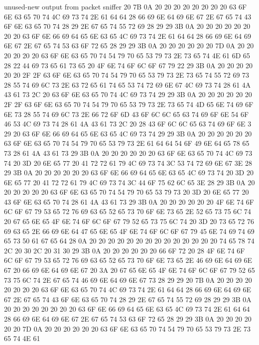 \begin{chunk}{unused-new output from packet sniffer}
20 7B 0A 20 20 20 20 20 20 20 20 63 6F 6E 63 65 70 74 4C 69 73 74 2E 61 64 
64 28 66 69 6E 64 69 6E 67 2E 67 65 74 43 6F 6E 63 65 70 74 28 29 2E 67 65 
74 55 72 69 28 29 29 3B 0A 20 20 20 20 20 20 20 20 63 6F 6E 66 69 64 65 6E 
63 65 4C 69 73 74 2E 61 64 64 28 66 69 6E 64 69 6E 67 2E 67 65 74 53 63 6F 
72 65 28 29 29 3B 0A 20 20 20 20 20 20 7D 0A 20 20 20 20 20 20 63 6F 6E 63 
65 70 74 54 79 70 65 53 79 73 2E 73 65 74 4E 61 6D 65 28 22 44 69 73 65 61 
73 65 20 4F 6E 74 6F 6C 6F 67 79 22 29 3B 0A 20 20 20 20 20 20 2F 2F 63 6F 
6E 63 65 70 74 54 79 70 65 53 79 73 2E 73 65 74 55 72 69 73 28 55 74 69 6C 
73 2E 63 72 65 61 74 65 53 74 72 69 6E 67 4C 69 73 74 28 61 4A 43 61 73 2C 
20 63 6F 6E 63 65 70 74 4C 69 73 74 29 29 3B 0A 20 20 20 20 20 20 2F 2F 63 
6F 6E 63 65 70 74 54 79 70 65 53 79 73 2E 73 65 74 4D 65 6E 74 69 6F 6E 73 
28 55 74 69 6C 73 2E 66 72 6F 6D 43 6F 6C 6C 65 63 74 69 6F 6E 54 6F 46 53 
4C 69 73 74 28 61 4A 43 61 73 2C 20 28 43 6F 6C 6C 65 63 74 69 6F 6E 
3
29 20 63 6F 6E 66 69 64 65 6E 63 65 4C 69 73 74 29 29 3B 0A 20 20 20 20 20 
20 63 6F 6E 63 65 70 74 54 79 70 65 53 79 73 2E 61 64 64 54 6F 49 6E 64 65 
78 65 73 28 61 4A 43 61 73 29 3B 0A 20 20 20 20 20 20 63 6F 6E 63 65 70 74 
4C 69 73 74 20 3D 20 6E 65 77 20 41 72 72 61 79 4C 69 73 74 3C 53 74 72 69 
6E 67 3E 28 29 3B 0A 20 20 20 20 20 20 63 6F 6E 66 69 64 65 6E 63 65 4C 69 
73 74 20 3D 20 6E 65 77 20 41 72 72 61 79 4C 69 73 74 3C 44 6F 75 62 6C 65 
3E 28 29 3B 0A 20 20 20 20 20 20 63 6F 6E 63 65 70 74 54 79 70 65 53 79 73 
20 3D 20 6E 65 77 20 43 6F 6E 63 65 70 74 28 61 4A 43 61 73 29 3B 0A 20 20 
20 20 20 20 4F 6E 74 6F 6C 6F 67 79 53 65 72 76 69 63 65 52 65 73 70 6F 6E 
73 65 2E 52 65 73 75 6C 74 20 67 65 6E 65 4F 6E 74 6F 6C 6F 67 79 52 65 73 
75 6C 74 20 3D 20 73 65 72 76 69 63 65 2E 66 69 6E 64 47 65 6E 65 4F 6E 74 
6F 6C 6F 67 79 45 6E 74 69 74 69 65 73 50 61 67 65 64 28 0A 20 20 20 20 20 
20 20 20 20 20 20 20 20 20 74 65 78 74 2C 20 30 2C 20 31 30 29 3B 0A 20 20 
20 20 20 20 66 6F 72 20 28 4F 6E 74 6F 6C 6F 67 79 53 65 72 76 69 63 65 52 
65 73 70 6F 6E 73 65 2E 46 69 6E 64 69 6E 67 20 66 69 6E 64 69 6E 67 20 3A 
20 67 65 6E 65 4F 6E 74 6F 6C 6F 67 79 52 65 73 75 6C 74 2E 67 65 74 46 69 
6E 64 69 6E 67 73 28 29 29 20 7B 0A 20 20 20 20 20 20 20 20 63 6F 6E 63 65 
70 74 4C 69 73 74 2E 61 64 64 28 66 69 6E 64 69 6E 67 2E 67 65 74 43 6F 6E 
63 65 70 74 28 29 2E 67 65 74 55 72 69 28 29 29 3B 0A 20 20 20 20 20 20 20 
20 63 6F 6E 66 69 64 65 6E 63 65 4C 69 73 74 2E 61 64 64 28 66 69 6E 64 69 
6E 67 2E 67 65 74 53 63 6F 72 65 28 29 29 3B 0A 20 20 20 20 20 20 7D 0A 20 
20 20 20 20 20 63 6F 6E 63 65 70 74 54 79 70 65 53 79 73 2E 73 65 74 4E 61 

\end{chunk}

